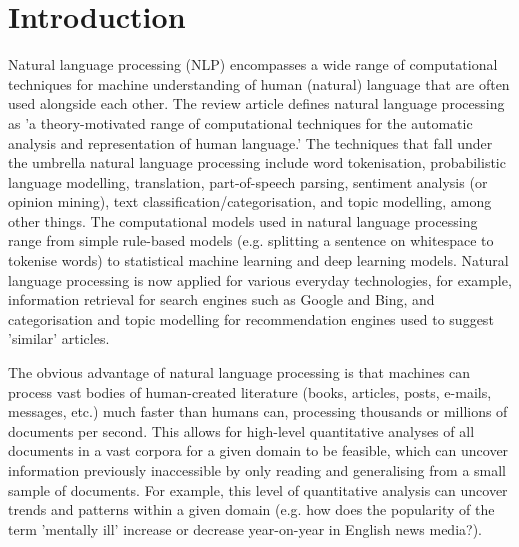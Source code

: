 \documentclass{report}
\begin{document}
\chapter{Introduction} \label{Introduction} %


Natural language processing (NLP) encompasses a wide range of computational techniques for machine understanding of human (natural) language that are often used alongside each other.
The review article \cite{cambria2014jumping} defines natural language processing as 'a theory-motivated range of computational techniques for the automatic analysis and representation of human language.'
The techniques that fall under the umbrella natural language processing include word tokenisation, probabilistic language modelling, translation, part-of-speech parsing, sentiment analysis (or opinion mining), text classification/categorisation, and topic modelling, among other things.
The computational models used in natural language processing range from simple rule-based models (e.g. splitting a sentence on whitespace to tokenise words) to statistical machine learning and deep learning models.
Natural language processing is now applied for various everyday technologies, for example, information retrieval for search engines such as Google and Bing, and categorisation and topic modelling for recommendation engines used to suggest 'similar' articles.

The obvious advantage of natural language processing is that machines can process vast bodies of human-created literature (books, articles, posts, e-mails, messages, etc.) much faster than humans can, processing thousands or millions of documents per second. 
This allows for high-level quantitative analyses of all documents in a vast corpora for a given domain to be feasible, which can uncover information previously inaccessible by only reading and generalising from a small sample of documents.
For example, this level of quantitative analysis can uncover trends and patterns within a given domain (e.g. how does the popularity of the term 'mentally ill' increase or decrease year-on-year in English news media?). 
\end{document}
